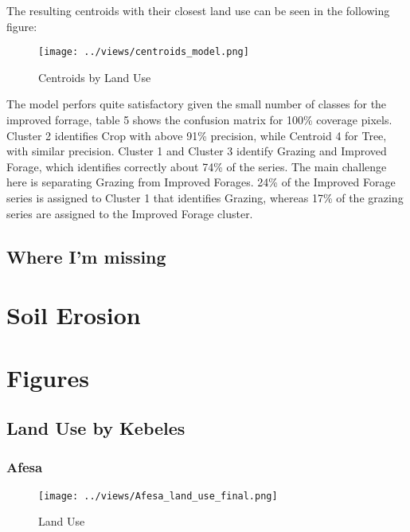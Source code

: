 \documentclass[10pt,a4paper,onecolumn]{article}
\begin{document}
The resulting centroids with their closest land use can be seen in the following figure:


\begin{figure}[H] \centering
  \captionsetup{justification=centering}
\caption{Centroids by Land Use} 
\centering
  \texttt{[image: ../views/centroids\_model.png]}

\end{figure}


The model perfors quite satisfactory given the small number of classes for the improved forrage, table 5 shows the confusion matrix for 100\% coverage pixels.  Cluster 2 identifies Crop with above 91\% precision, while Centroid 4 for Tree, with similar precision. Cluster 1 and Cluster 3 identify Grazing and Improved Forage, which identifies correctly about 74\% of the series. The main challenge here is separating Grazing from Improved Forages. 24\% of the Improved Forage series is assigned to Cluster 1 that identifies Grazing, whereas 17\% of the grazing series are assigned to the Improved Forage cluster.




\subsection{Where I'm missing}
%


\pagebreak

\section{Soil Erosion}


\pagebreak


\section{Figures}
\subsection{Land Use by Kebeles}


\subsubsection{Afesa}


\begin{figure}[H] \centering
  \captionsetup{justification=centering}
\caption{Land Use} 
\centering


\texttt{[image: ../views/Afesa\_land\_use\_final.png]}

\end{figure}
\end{document}
